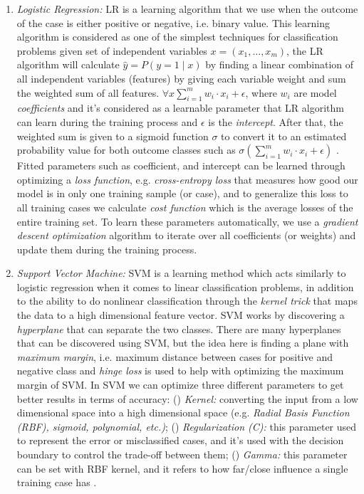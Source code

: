 \begin{enumerate}
	\item \textit{Logistic Regression:} LR is a  learning algorithm that we use when the outcome of the case is either positive or negative, i.e. binary value. This learning algorithm is considered as one of the simplest techniques for classification problems given set of independent variables $x= (x_1, \dots, x_m)$, the LR algorithm will calculate $\hat{y} = P(y=1 \mid x)$ by finding a linear combination of all independent variables (features) by giving each variable weight and sum the weighted sum of all features. $\forall x \sum_{i=1}^{m} w_i \cdot x_i + \epsilon $, where $w_i$ are model \textit{coefficients} and it's considered as a learnable parameter that LR algorithm can learn during the training process and $\epsilon$ is the \textit{intercept}. After that, the weighted sum is given to a sigmoid function $\sigma$ to convert it to an estimated probability value for both outcome classes such as $\sigma (\sum_{i=1}^{m} w_i \cdot x_i + \epsilon)$ . Fitted parameters such as coefficient, and intercept can be learned through optimizing a \textit{loss function}, e.g. \textit{cross-entropy loss} that measures how good our model is in only one training sample (or case), and to generalize this loss to all training cases we calculate \textit{cost function} which is the average losses of the entire training set. To learn these parameters automatically, we use a \textit{gradient descent optimization} algorithm to iterate over all coefficients (or weights) and update them during the training process. 

	\item \textit{Support Vector Machine:} SVM is a learning method which acts similarly to logistic regression when it comes to linear classification problems, in addition to the ability to do nonlinear classification through the \textit{kernel trick} that maps the data to a high dimensional feature vector. SVM works by discovering a \textit{hyperplane} that can separate the two classes. There are many hyperplanes that can be discovered using SVM, but the idea here is finding a plane with \textit{maximum margin}, i.e. maximum distance between cases for positive and negative class and \textit{hinge loss} is used to help with optimizing the maximum margin of SVM. In SVM we can optimize three different parameters to get better results in terms of accuracy: () \textit{Kernel:} converting the input from a low dimensional space into a high dimensional space (e.g.  \textit{Radial Basis Function (RBF), sigmoid, polynomial, etc.)}; () \textit{Regularization (C):} this parameter used to represent the error or misclassified cases, and it’s used with the decision boundary to control the trade-off between them; () \textit{Gamma:} this parameter can be set with RBF kernel, and it refers to how far/close influence a single training case has \cite{platt1999probabilistic}.

\end{enumerate}

